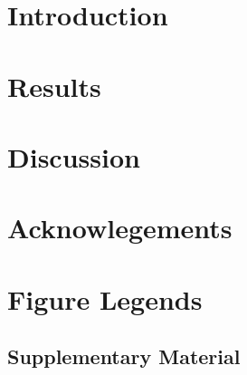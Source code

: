 \begin{bibunit}[naturemag]

{\begin{quote} \bf

\end{quote}}
% 


\section{Introduction}


\section{Results}


\section{Discussion}


\section{Acknowlegements}

{\footnotesize
% 
% 
}


\pagebreak
\FloatBarrier
\section{Figure Legends}

\end{bibunit}

\pagebreak
\FloatBarrier

\begin{bibunit}[naturemag]

\beginsupplement
\setcounter{secnumdepth}{4}
\section{Supplementary Material}



{\footnotesize
% 
% 
}
\pagebreak


\pagebreak


\end{bibunit}


